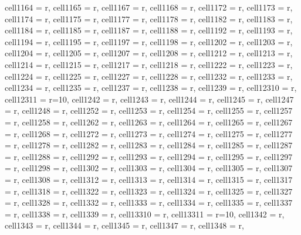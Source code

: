 \begin{longtblr}[
  caption = {Linear model estimating all the considered metrics in every alternative scenario.},
  label = {tab:appendix_LCBM_all_metrics_all_scenarios}
]
{  cell{116}{4} = {r},
  cell{116}{5} = {r},
  cell{116}{7} = {r},
  cell{116}{8} = {r},
  cell{117}{2} = {r},
  cell{117}{3} = {r},
  cell{117}{4} = {r},
  cell{117}{5} = {r},
  cell{117}{7} = {r},
  cell{117}{8} = {r},
  cell{118}{2} = {r},
  cell{118}{3} = {r},
  cell{118}{4} = {r},
  cell{118}{5} = {r},
  cell{118}{7} = {r},
  cell{118}{8} = {r},
  cell{119}{2} = {r},
  cell{119}{3} = {r},
  cell{119}{4} = {r},
  cell{119}{5} = {r},
  cell{119}{7} = {r},
  cell{119}{8} = {r},
  cell{120}{2} = {r},
  cell{120}{3} = {r},
  cell{120}{4} = {r},
  cell{120}{5} = {r},
  cell{120}{7} = {r},
  cell{120}{8} = {r},
  cell{121}{2} = {r},
  cell{121}{3} = {r},
  cell{121}{4} = {r},
  cell{121}{5} = {r},
  cell{121}{7} = {r},
  cell{121}{8} = {r},
  cell{122}{2} = {r},
  cell{122}{3} = {r},
  cell{122}{4} = {r},
  cell{122}{5} = {r},
  cell{122}{7} = {r},
  cell{122}{8} = {r},
  cell{123}{2} = {r},
  cell{123}{3} = {r},
  cell{123}{4} = {r},
  cell{123}{5} = {r},
  cell{123}{7} = {r},
  cell{123}{8} = {r},
  cell{123}{9} = {r},
  cell{123}{10} = {r},
  cell{123}{11} = {r=10}{},
  cell{124}{2} = {r},
  cell{124}{3} = {r},
  cell{124}{4} = {r},
  cell{124}{5} = {r},
  cell{124}{7} = {r},
  cell{124}{8} = {r},
  cell{125}{2} = {r},
  cell{125}{3} = {r},
  cell{125}{4} = {r},
  cell{125}{5} = {r},
  cell{125}{7} = {r},
  cell{125}{8} = {r},
  cell{126}{2} = {r},
  cell{126}{3} = {r},
  cell{126}{4} = {r},
  cell{126}{5} = {r},
  cell{126}{7} = {r},
  cell{126}{8} = {r},
  cell{127}{2} = {r},
  cell{127}{3} = {r},
  cell{127}{4} = {r},
  cell{127}{5} = {r},
  cell{127}{7} = {r},
  cell{127}{8} = {r},
  cell{128}{2} = {r},
  cell{128}{3} = {r},
  cell{128}{4} = {r},
  cell{128}{5} = {r},
  cell{128}{7} = {r},
  cell{128}{8} = {r},
  cell{129}{2} = {r},
  cell{129}{3} = {r},
  cell{129}{4} = {r},
  cell{129}{5} = {r},
  cell{129}{7} = {r},
  cell{129}{8} = {r},
  cell{130}{2} = {r},
  cell{130}{3} = {r},
  cell{130}{4} = {r},
  cell{130}{5} = {r},
  cell{130}{7} = {r},
  cell{130}{8} = {r},
  cell{131}{2} = {r},
  cell{131}{3} = {r},
  cell{131}{4} = {r},
  cell{131}{5} = {r},
  cell{131}{7} = {r},
  cell{131}{8} = {r},
  cell{132}{2} = {r},
  cell{132}{3} = {r},
  cell{132}{4} = {r},
  cell{132}{5} = {r},
  cell{132}{7} = {r},
  cell{132}{8} = {r},
  cell{133}{2} = {r},
  cell{133}{3} = {r},
  cell{133}{4} = {r},
  cell{133}{5} = {r},
  cell{133}{7} = {r},
  cell{133}{8} = {r},
  cell{133}{9} = {r},
  cell{133}{10} = {r},
  cell{133}{11} = {r=10}{},
  cell{134}{2} = {r},
  cell{134}{3} = {r},
  cell{134}{4} = {r},
  cell{134}{5} = {r},
  cell{134}{7} = {r},
  cell{134}{8} = {r},
}
\end{longtblr}
